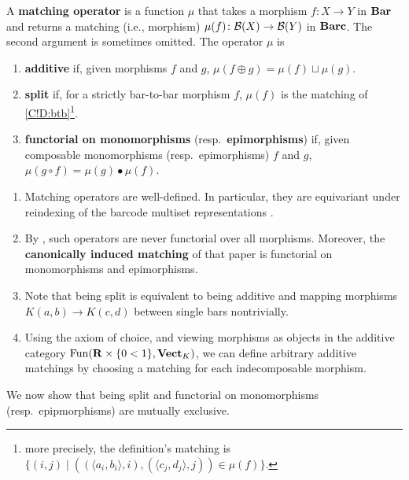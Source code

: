 \begin{definition}
\label{C!D:matching-operator}
  A \textbf{matching operator} is a function $\mu$ that takes a morphism $f \colon X \to Y$ in $\Bar$ and returns a matching (i.e., morphism) $\mu(f) \colon \cc{B}(X) \to \cc{B}(Y)$ in $\Barc$. The second argument is sometimes omitted. The operator $\mu$ is
  \begin{enumerate}
    \item {}\textbf{additive} if, given morphisms $f$ and $g$, $\mu(f \oplus g) = \mu(f) \sqcup \mu(g)$.
    \item {}\textbf{split} if, for a strictly bar-to-bar morphism $f$, $\mu(f)$ is the matching of \cref{C!D:btb}\footnote{more precisely, the definition's matching is $\{(i, j) \mid ((\langle a_i, b_i \rangle, i), (\langle c_j, d_j \rangle, j)) \in \mu(f)\}$.}.
    \item {}\textbf{functorial on monomorphisms} (resp.\ \textbf{epimorphisms}) if, given composable monomorphisms (resp.\ epimorphisms) $f$ and $g$, $\mu(g \circ f) = \mu(g) \bullet \mu(f)$. \qedhere
  \end{enumerate}
\end{definition}

\begin{remark}
  \begin{enumerate}
    \item Matching operators are well-defined. In particular, they are equivariant under reindexing of the barcode multiset representations \cite{BauerLesnick2020}.
    \item By \cite[Proposition 5.10]{BauerLesnick2015}, such operators are never functorial over all morphisms. Moreover, the \textbf{canonically induced matching} of that paper is functorial on monomorphisms and epimorphisms.
    \item Note that being split is equivalent to being additive and mapping morphisms $K(a, b) \to K(c, d)$ between single bars nontrivially.
    \item Using the axiom of choice, and viewing morphisms as objects in the additive category $\Fun(\R \times \{0 < 1\}, \Vect_K)$, we can define arbitrary additive matchings by choosing a matching for each indecomposable morphism. \qedhere
  \end{enumerate}
\end{remark}

We now show that being split and functorial on monomorphisms (resp.\ epipmorphisms) are mutually exclusive.

